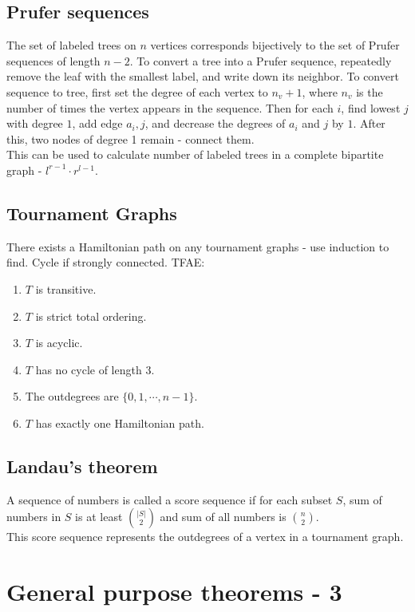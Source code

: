     \subsection{Prufer sequences}
    The set of labeled trees on $n$ vertices corresponds bijectively to the set of Prufer sequences of length $n-2$.
    To convert a tree into a Prufer sequence, repeatedly remove the leaf with the smallest label, and write down its neighbor.
    To convert sequence to tree, first set the degree of each vertex to $n_v + 1$, where $n_v$ is the number of times
    the vertex appears in the sequence. Then for each $i$, find lowest $j$ with degree $1$, add edge $a_i, j$, and decrease
    the degrees of $a_i$ and $j$ by $1$. After this, two nodes of degree 1 remain - connect them.\\
    This can be used to calculate number of labeled trees in a complete bipartite graph - $l^{r-1}\cdot r^{l-1}$.

    \subsection{Tournament Graphs}
    There exists a Hamiltonian path on any tournament graphs - use induction to find. Cycle if strongly connected. TFAE:
    \begin{enumerate}
      \item
      $T$ is transitive.
      \item
      $T$ is strict total ordering.
      \item
      $T$ is acyclic.
      \item
      $T$ has no cycle of length $3$.
      \item
      The outdegrees are $\{0, 1, \cdots, n-1\}$.
      \item
      $T$ has exactly one Hamiltonian path.
    \end{enumerate}
    \subsection{Landau's theorem}
    A sequence of numbers is called a score sequence if for each subset $S$, sum of 
    numbers in $S$ is at least $\binom{|S|}{2}$ and sum of all numbers is $\binom{n}{2}$.\\
    This score sequence represents the outdegrees of a vertex in a tournament graph.

 \section{General purpose theorems - 3}

